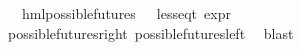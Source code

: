 \begin{isabellebody}
\ \ \ {\isachardoublequoteopen}hml{\isacharunderscore}{\kern0pt}possible{\isacharunderscore}{\kern0pt}futures\ {\isasymphi}\ {\isacharequal}{\kern0pt}\ less{\isacharunderscore}{\kern0pt}eq{\isacharunderscore}{\kern0pt}t\ {\isacharparenleft}{\kern0pt}expr\ {\isasymphi}{\isacharparenright}{\kern0pt}\ {\isacharparenleft}{\kern0pt}{\isasyminfinity}{\isacharcomma}{\kern0pt}\ {}{\isacharcomma}{\kern0pt}\ {\isasyminfinity}{\isacharcomma}{\kern0pt}\ {\isasyminfinity}{\isacharcomma}{\kern0pt}\ {\isasyminfinity}{\isacharcomma}{\kern0pt}\ {}{\isacharparenright}{\kern0pt}{\isachardoublequoteclose}\isanewline
%
\isadelimproof
\ \ %
\endisadelimproof
%
\isatagproof
{}\isamarkupfalse%
\ possible{\isacharunderscore}{\kern0pt}futures{\isacharunderscore}{\kern0pt}right\ possible{\isacharunderscore}{\kern0pt}futures{\isacharunderscore}{\kern0pt}left\ \isamarkupfalse%
\ blast%
\endisatagproof
{\isafoldproof}%
%
\isadelimproof
\isanewline
%
\endisadelimproof
%
\isadelimtheory
\isanewline
%
\endisadelimtheory
%
\isatagtheory
{}\isamarkupfalse%
%
\endisatagtheory
{\isafoldtheory}%
%
\isadelimtheory
%
\endisadelimtheory
%
\end{isabellebody}%
\endinput
